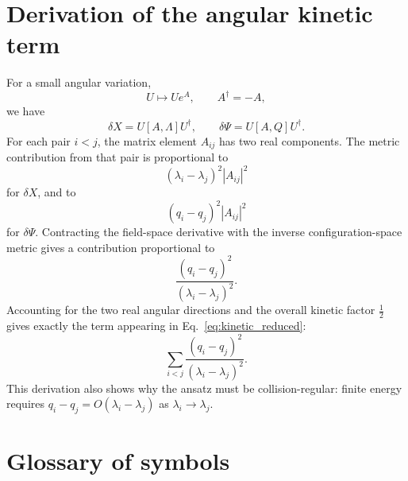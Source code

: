 \documentclass[11pt]{article}
\begin{document}
\appendix

\section{Derivation of the angular kinetic term}

For a small angular variation,
\begin{equation}
U\mapsto Ue^A,
\qquad A^\dagger=-A,
\end{equation}
we have
\begin{equation}
\delta X=U[A,\Lambda]U^\dagger,
\qquad
\delta\Psi=U[A,Q]U^\dagger.
\end{equation}
For each pair $i<j$, the matrix element $A_{ij}$ has two real components.  The metric contribution from that pair is proportional to
\begin{equation}
(\lambda_i-\lambda_j)^2|A_{ij}|^2
\end{equation}
for $\delta X$, and to
\begin{equation}
(q_i-q_j)^2|A_{ij}|^2
\end{equation}
for $\delta\Psi$.  Contracting the field-space derivative with the inverse configuration-space metric gives a contribution proportional to
\begin{equation}
\frac{(q_i-q_j)^2}{(\lambda_i-\lambda_j)^2}.
\end{equation}
Accounting for the two real angular directions and the overall kinetic factor $\frac12$ gives exactly the term appearing in Eq.~\eqref{eq:kinetic_reduced}:
\begin{equation}
\sum_{i<j}\frac{(q_i-q_j)^2}{(\lambda_i-\lambda_j)^2}.
\end{equation}
This derivation also shows why the ansatz must be collision-regular: finite energy requires $q_i-q_j=O(\lambda_i-\lambda_j)$ as $\lambda_i\to\lambda_j$.

\section{Glossary of symbols}
\end{document}
